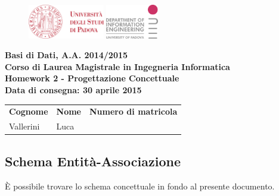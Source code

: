 \documentclass[a4paper]{scrartcl}
\newcommand{\corso}{Basi di Dati}
\newcommand{\anac}{A.A. 2014/2015}
\newcommand{\laurea}{Corso di Laurea Magistrale in Ingegneria Informatica}
\newcommand{\matricola}{1110975}
\newcommand{\nome}{Luca}
\newcommand{\cognome}{Vallerini}
\newcommand{\data}{Data di consegna: 30 aprile 2015}
\newcommand{\consegna}{Homework 2 - Progettazione Concettuale}
\begin{document}
\begin{footnotesize}

\begin{figure}
	\begin{minipage}[t]{\textwidth}
		\includegraphics[height=15mm]{img/logounipd}
		\hfill
		\includegraphics[height=15mm]{img/logodei}
	\end{minipage}
\end{figure}

{
\centering
\textbf{\corso , \anac} \\
\textbf{\laurea} \\
\vspace{5pt}
\textbf{\consegna} \\
\textbf{\small\data}


\begin{table}[h]
	\begin{tabularx}{\textwidth}{|X|X|X|}
		\hline
		\multicolumn{1}{|c|}{\textbf{Cognome}} &
		\multicolumn{1}{c|}{\textbf{Nome}} &
		\multicolumn{1}{c|}{\textbf{Numero di matricola}} \\
		\centering\cognome &
		\centering\nome &
		\centering\matricola \tabularnewline
		\hline
	\end{tabularx}
\end{table}

}	

\subsection*{\color[RGB]{155,0,20}Schema Entità-Associazione}
È possibile trovare lo schema concettuale in fondo al presente documento.


\end{footnotesize}
\end{document}
